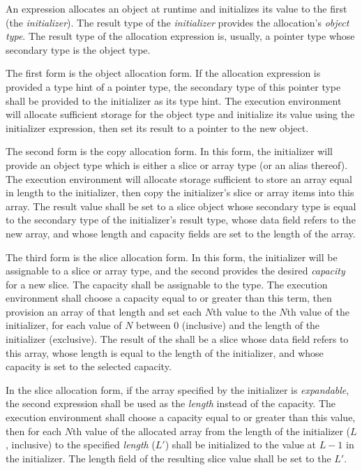\specsubsubitem
An  expression allocates an object at runtime and initializes
its value to the first  (the \textit{initializer}). The
result type of the \textit{initializer} provides the allocation's
\textit{object type}. The result type of the allocation expression is, usually,
a pointer type whose secondary type is the object type.

\specsubsubitem
The first form is the object allocation form. If the allocation expression is
provided a type hint of a pointer type, the secondary type of this pointer type
shall be provided to the initializer as its type hint. The execution
environment will allocate sufficient storage for the object type and initialize
its value using the initializer expression, then set its result to a pointer to
the new object.

\specsubsubitem
The second form is the copy allocation form. In this form, the initializer will
provide an object type which is either a slice or array type (or an alias
thereof). The execution environment will allocate storage sufficient to store
an array equal in length to the initializer, then copy the initializer's slice
or array items into this array. The result value shall be set to a slice object
whose secondary type is equal to the secondary type of the initializer's result
type, whose data field refers to the new array, and whose length and capacity
fields are set to the length of the array.

\specsubsubitem
The third form is the slice allocation form. In this form, the initializer will
be assignable to a slice or array type, and the second 
provides the desired \textit{capacity} for a new slice. The capacity shall be
assignable to the  type. The execution environment shall
choose a capacity equal to or greater than this term, then provision an array
of that length and set each $N$th value to the $N$th value of the initializer,
for each value of $N$ between $0$ (inclusive) and the length of the initializer
(exclusive). The result of the  shall be a
slice whose data field refers to this array, whose length is equal to the
length of the initializer, and whose capacity is set to the selected capacity.

\specsubsubitem
In the slice allocation form, if the array specified by the initializer is
\textit{expandable}, the second expression shall be used as the \textit{length}
instead of the capacity. The execution environment shall choose a capacity
equal to or greater than this value, then for each $N$th value of the allocated
array from the length of the initializer ($L$, inclusive) to the specified
\textit{length} ($L'$) shall be initialized to the value at $L-1$ in the
initializer. The length field of the resulting slice value shall be set to the
$L'$.

